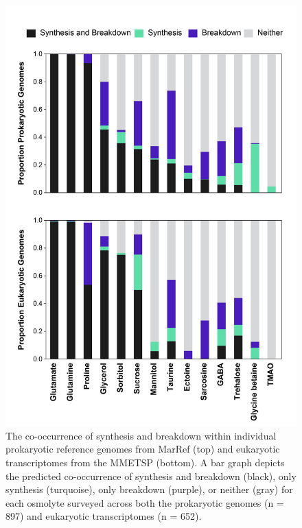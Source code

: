 \documentclass[utf8]{frontiersSCNS} %
\begin{document}
\begin{figure}[h!]
    \centering
    \includegraphics[width = 0.8\columnwidth]{Figures/Synthesis-BD-Cooccurance-01.png}
    \caption{The co-occurrence of synthesis and breakdown within individual prokaryotic reference genomes from MarRef (top) and eukaryotic transcriptomes from the MMETSP (bottom). A bar graph depicts the predicted co-occurrence of synthesis and breakdown (black), only synthesis (turquoise), only breakdown (purple), or neither (gray) for each osmolyte surveyed across both the prokaryotic genomes (n = 897) and eukaryotic transcriptomes (n = 652). }
    \label{fig:cooccur}
\end{figure}
\end{document}
